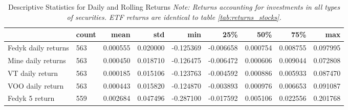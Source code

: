 \begin{appendices}
\begin{table}[ht]
\centering
\caption{Descriptive Statistics for Daily and Rolling Returns
\newline \footnotesize{\textit{Note: Returns accounting for investments in all types of securities. ETF returns are identical to table \ref{tab:returns_stocks}.}}}
\begin{adjustbox}{width=\textwidth}
    \begin{tabular}{@{}l|llllllll@{}}
    \toprule
    \multicolumn{1}{r}{\textbf{}}       & \multicolumn{1}{r}{\textbf{count}} & \multicolumn{1}{r}{\textbf{mean}} & \multicolumn{1}{r}{\textbf{std}} & \multicolumn{1}{r}{\textbf{min}} & \multicolumn{1}{r}{\textbf{25\%}} & \multicolumn{1}{r}{\textbf{50\%}} & \multicolumn{1}{r}{\textbf{75\%}} & \multicolumn{1}{r}{\textbf{max}} \\ \midrule
    Fedyk daily returns           & 563                                & 0.000555                          & 0.020000                         & -0.125369                        & -0.006658                         & 0.000754                          & 0.008755                          & 0.097995                         \\
    Mine daily returns            & 563                                & 0.000450                          & 0.018710                         & -0.126475                        & -0.006472                         & 0.000606                          & 0.009044                          & 0.072808                         \\
    VT daily return             & 563                               & 0.000185                           & 0.015106                         & -0.123763                        & -0.004592                         & 0.000886                          & 0.005933                          & 0.087470                         \\
    VOO daily return            & 563                               & 0.000443                           & 0.015820                         & -0.124870                        & -0.003893                         & 0.000976                          & 0.006653                          & 0.091087                         \\
    Fedyk 5 return                & 559                                & 0.002684                          & 0.047496                         & -0.287100                        & -0.017592                         & 0.005106                          & 0.022556                          & 0.201768                         \\

\end{tabular}
\end{adjustbox}
\end{table}
\end{appendices}

